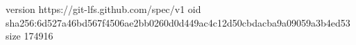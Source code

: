 version https://git-lfs.github.com/spec/v1
oid sha256:6d527a46bd567f4506ae2bb0260d0d449ac4c12d50cbdacba9a09059a3b4ed53
size 174916
